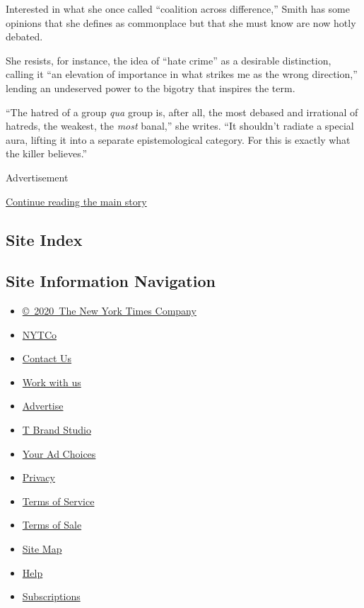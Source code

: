 Interested in what she once called ``coalition across difference,''
Smith has some opinions that she defines as commonplace but that she
must know are now hotly debated.

She resists, for instance, the idea of ``hate crime'' as a desirable
distinction, calling it ``an elevation of importance in what strikes me
as the wrong direction,'' lending an undeserved power to the bigotry
that inspires the term.

``The hatred of a group \emph{qua} group is, after all, the most debased
and irrational of hatreds, the weakest, the \emph{most} banal,'' she
writes. ``It shouldn't radiate a special aura, lifting it into a
separate epistemological category. For this is exactly what the killer
believes.''

Advertisement

\protect\hyperlink{after-bottom}{Continue reading the main story}

\hypertarget{site-index}{%
\subsection{Site Index}\label{site-index}}

\hypertarget{site-information-navigation}{%
\subsection{Site Information
Navigation}\label{site-information-navigation}}

\begin{itemize}
\tightlist
\item
  \href{https://help.nytimes.com/hc/en-us/articles/115014792127-Copyright-notice}{©~2020~The
  New York Times Company}
\end{itemize}

\begin{itemize}
\tightlist
\item
  \href{https://www.nytco.com/}{NYTCo}
\item
  \href{https://help.nytimes.com/hc/en-us/articles/115015385887-Contact-Us}{Contact
  Us}
\item
  \href{https://www.nytco.com/careers/}{Work with us}
\item
  \href{https://nytmediakit.com/}{Advertise}
\item
  \href{http://www.tbrandstudio.com/}{T Brand Studio}
\item
  \href{https://www.nytimes.com/privacy/cookie-policy\#how-do-i-manage-trackers}{Your
  Ad Choices}
\item
  \href{https://www.nytimes.com/privacy}{Privacy}
\item
  \href{https://help.nytimes.com/hc/en-us/articles/115014893428-Terms-of-service}{Terms
  of Service}
\item
  \href{https://help.nytimes.com/hc/en-us/articles/115014893968-Terms-of-sale}{Terms
  of Sale}
\item
  \href{https://spiderbites.nytimes.com}{Site Map}
\item
  \href{https://help.nytimes.com/hc/en-us}{Help}
\item
  \href{https://www.nytimes.com/subscription?campaignId=37WXW}{Subscriptions}
\end{itemize}
